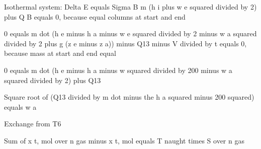 Isothermal system:
Delta E equals Sigma B m (h i plus w e squared divided by 2) plus Q B equals 0, because equal columns at start and end

0 equals m dot (h e minus h a minus w e squared divided by 2 minus w a squared divided by 2 plus g (z e minus z a)) minus Q13 minus V divided by t equals 0, because mass at start and end equal

0 equals m dot (h e minus h a minus w squared divided by 200 minus w a squared divided by 2) plus Q13

Square root of (Q13 divided by m dot minus the h a squared minus 200 squared) equals w a

Exchange from T6

Sum of x t, mol over n gas minus x t, mol equals T naught times S over n gas
